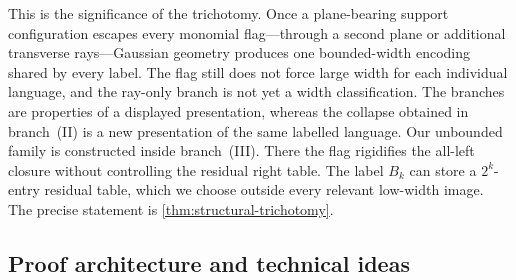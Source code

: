\documentclass[11pt]{article}
\theoremstyle{definition}
\theoremstyle{remark}
\begin{document}
This is the significance of the trichotomy.  Once a plane-bearing support
configuration escapes every monomial flag---through a second plane or
additional transverse rays---Gaussian geometry produces one bounded-width
encoding shared by every label.  The flag still does not force large width for each individual
language, and the ray-only branch is not yet a width classification.  The
branches are properties of a displayed presentation, whereas the collapse
obtained in branch~\textup{(II)} is a new presentation of the same labelled
language.  Our unbounded family is constructed inside branch~\textup{(III)}.
There the flag rigidifies the all-left closure without controlling the
residual right table.  The label $B_k$ can store a $2^k$-entry residual
table, which we choose outside every relevant low-width image.
The precise statement is \cref{thm:structural-trichotomy}.

\subsection{Proof architecture and technical ideas}
\end{document}
